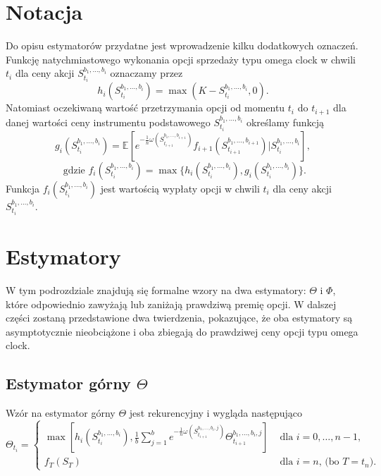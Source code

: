 \documentclass[]{pwr_wmat_praca_dyplomowa}
\theoremstyle{plain}
\numberwithin{theorem}{chapter}
\theoremstyle{definition}
\numberwithin{theorem}{chapter}
\begin{document}
\section{Notacja}
Do opisu estymatorów przydatne jest wprowadzenie kilku dodatkowych oznaczeń.\\
\newline
Funkcję natychmiastowego wykonania opcji sprzedaży typu omega clock w chwili $t_i$ dla ceny akcji $S_{t_i}^{b_1,\ldots,b_i}$ oznaczamy przez
\begin{equation*}
h_i(S_{t_i}^{b_1,\ldots,b_i}) = \max(K-S_{t_i}^{b_1,\ldots,b_i},0).
\end{equation*}
Natomiast oczekiwaną wartość przetrzymania opcji od momentu $t_i$ do $t_{i+1}$ dla danej wartości ceny instrumentu podstawowego $S_{t_i}^{b_1,\ldots,b_i}$ określamy funkcją 
\begin{equation*}
g_i(S_{t_i}^{b_1,\ldots,b_i}) = \mathbb{E}[e^{-\frac{1}{n}\omega(S_{t_{i+1}}^{b_1,\ldots,b_{i+1}})}f_{i+1}(S_{t_{i+1}}^{b_1,\ldots,b_{i+1}})|S_{t_i}^{b_1,\ldots,b_i}],
\end{equation*}
\begin{equation*}
\textrm{ gdzie }f_i(S_{t_i}^{b_1,\ldots,b_i}) = \max\{h_i(S_{t_i}^{b_1,\ldots,b_i}),g_i(S_{t_i}^{b_1,\ldots,b_i})\}.
\end{equation*}
Funkcja $f_i(S_{t_i}^{b_1,\ldots,b_i})$ jest wartością wypłaty opcji w chwili $t_i$ dla ceny akcji $S_{t_i}^{b_1,\ldots,b_i}$.

\section{Estymatory}
W tym podrozdziale znajdują się formalne wzory na dwa estymatory: $\Theta$ i $\Phi$, które odpowiednio zawyżają lub zaniżają prawdziwą premię opcji. W dalszej części zostaną przedstawione dwa twierdzenia, pokazujące, że oba estymatory są asymptotycznie nieobciążone i oba zbiegają do prawdziwej ceny opcji typu omega clock.

\subsection{Estymator górny $\Theta$}

Wzór na estymator górny $\Theta$ jest rekurencyjny i wygląda następująco
\begin{equation}
\label{eq:gorny}
\Theta_{t_i} = \left\{ \begin{array}{ll}
\max [h_i(S_{t_i}^{b_1,\ldots, b_i}), \frac{1}{b}\sum_{j=1}^b e^{-\frac{1}{n}\omega(S_{t_{i+1}}^{b_1,\ldots,b_i,j})}\Theta_{t_{i+1}}^{b_1,\ldots, b_i,j}] & \textrm{ dla } i=0,\ldots,n-1,\\
 f_{T}(S_{T}) & \textrm{ dla } i=n \textrm{, (bo }T = t_n).
\end{array} \right.
\end{equation}
\end{document}
